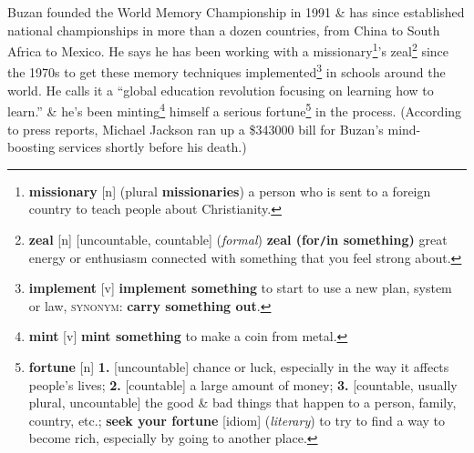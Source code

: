 \documentclass[oneside]{book}
\numberwithin{equation}{section}
\begin{document}
Buzan founded the World Memory Championship in 1991 \& has since established national championships in more than a dozen countries, from China to South Africa to Mexico. He says he has been working with a missionary\footnote{\textbf{missionary} [n] (plural \textbf{missionaries}) a person who is sent to a foreign country to teach people about Christianity.}'s zeal\footnote{\textbf{zeal} [n] [uncountable, countable] (\textit{formal}) \textbf{zeal (for\texttt{/}in something)} great energy or enthusiasm connected with something that you feel strong about.} since the 1970s to get these memory techniques implemented\footnote{\textbf{implement} [v] \textbf{implement something} to start to use a new plan, system or law, \textsc{synonym}: \textbf{carry something out}.} in schools around the world. He calls it a ``global education revolution focusing on learning how to learn.'' \& he's been minting\footnote{\textbf{mint} [v] \textbf{mint something} to make a coin from metal.} himself a serious fortune\footnote{\textbf{fortune} [n] \textbf{1.} [uncountable] chance or luck, especially in the way it affects people's lives; \textbf{2.} [countable] a large amount of money; \textbf{3.} [countable, usually plural, uncountable] the good \& bad things that happen to a person, family, country, etc.; \textbf{seek your fortune} [idiom] (\textit{literary}) to try to find a way to become rich, especially by going to another place.} in the process. (According to press reports, Michael Jackson ran up a \$343000 bill for Buzan's mind-boosting services shortly before his death.)
\end{document}
